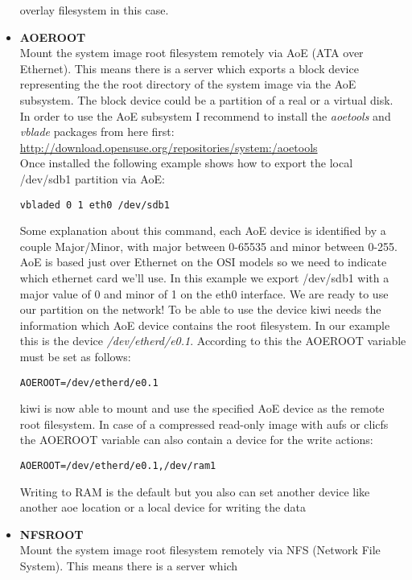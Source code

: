 \begin{itemize}
        overlay filesystem in this case.
    \item \textbf{AOEROOT}\\
        Mount the system image root filesystem remotely via AoE
        (ATA over Ethernet). This means there is a server which
        exports a block device representing the the root directory of
        the system image via the AoE subsystem. The block device
        could be a partition of a real or a virtual disk. In order to
        use the AoE subsystem I recommend to install the \textit{aoetools}
        and \textit{vblade} packages from here first:\\
        \url{http://download.opensuse.org/repositories/system:/aoetools}\\
        Once installed the following example shows how to export
        the local /dev/sdb1 partition via AoE:
\begin{verbatim}
vbladed 0 1 eth0 /dev/sdb1
\end{verbatim}
        Some explanation about this command, each AoE device is identified
        by a couple Major/Minor, with major between 0-65535 and minor
        between 0-255. AoE is based just over Ethernet on the OSI models
        so we need to indicate which ethernet card we'll use. 
        In this example we export /dev/sdb1 with a major value of 0 and
        minor of 1 on the eth0 interface. We are ready to use our partition
        on the network! To be able to use the device kiwi needs the
        information which AoE device contains the root filesystem. In
        our example this is the device \textit{/dev/etherd/e0.1}.
        According to this the AOEROOT variable must be set as follows:
\begin{verbatim}
AOEROOT=/dev/etherd/e0.1
\end{verbatim}
        kiwi is now able to mount and use the specified AoE device
        as the remote root filesystem. In case of a compressed read-only
        image with aufs or clicfs the AOEROOT variable can also contain
        a device for the write actions:
\begin{verbatim}
AOEROOT=/dev/etherd/e0.1,/dev/ram1
\end{verbatim}
        Writing to RAM is the default but you also can set another device
        like another aoe location or a local device for writing the data
    \item \textbf{NFSROOT}\\
         Mount the system image root filesystem remotely via NFS
         (Network File System). This means there is a server which

\end{itemize}
